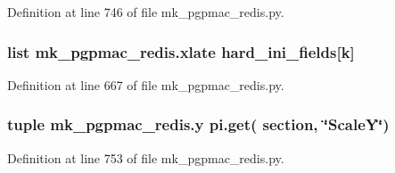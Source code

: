Definition at line 746 of file mk\-\_\-pgpmac\-\_\-redis.\-py.

\hypertarget{namespacemk__pgpmac__redis_afba647feb8fc4d0a364c3dca29af3a22}{
\subsubsection[{xlate}]{\setlength{\rightskip}{0pt plus 5cm}list mk\-\_\-pgpmac\-\_\-redis.\-xlate {\bf hard\-\_\-ini\-\_\-fields}\mbox{[}k\mbox{]}}}\label{namespacemk__pgpmac__redis_afba647feb8fc4d0a364c3dca29af3a22}


Definition at line 667 of file mk\-\_\-pgpmac\-\_\-redis.\-py.

\hypertarget{namespacemk__pgpmac__redis_a34220d58136fb95853f54ed51a130f79}{
\subsubsection[{y}]{\setlength{\rightskip}{0pt plus 5cm}tuple mk\-\_\-pgpmac\-\_\-redis.\-y pi.\-get( section, \char`\"{}Scale\-Y\char`\"{})}}\label{namespacemk__pgpmac__redis_a34220d58136fb95853f54ed51a130f79}


Definition at line 753 of file mk\-\_\-pgpmac\-\_\-redis.\-py.


